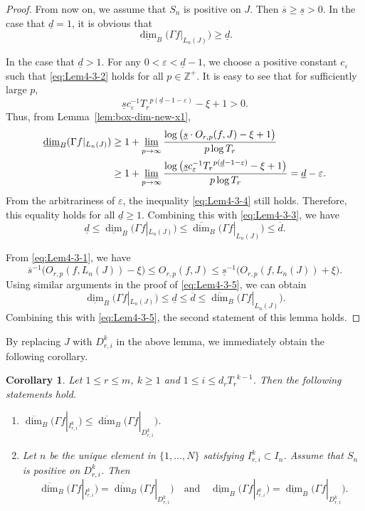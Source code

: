 \documentclass[11pt]{amsart}
\newtheorem{cor}[thm]{Corollary}
\theoremstyle{definition}
\theoremstyle{remark}
\numberwithin{equation}{section}
\newcommand{\bZp}{{{\mathbb Z}^+}}
\newcommand{\upd}{{\overline{d}}}
\newcommand{\lowd}{{\underline{d}}}
\newcommand{\ups}{{\overline{s} }}
\newcommand{\lows}{{\underline{s}}}
\def\vep{\varepsilon}
\def\updimB{\overline{\dim}_B}
\def\lowdimB{\underline{\dim}_B}
\begin{document}
\begin{proof}
	From now on, we assume that $S_n$ is positive on $J$. Then $\ups \geq \lows >0$. In the case that $\lowd=1$, it is obvious that    \begin{equation}\label{eq:Lem4-3-4}
		\lowdimB \big(\Gamma f|_{L_n(J)}\big)\geq \lowd. 
	\end{equation}
	
	In the case that $\lowd>1$. For any $0<\vep < \lowd-1$, we choose a positive constant $c_\vep$ such that \eqref{eq:Lem4-3-2} holds for all $p\in \bZp$. It is easy to see that for sufficiently large $p$,
	\[
	\lows c_\vep^{-1}  {T_r}^{p ( \lowd -1-\vep)}-\xi+1>0.
	\]
	Thus, from Lemma~\ref{lem:box-dim-new-x1},
	\begin{align*}
		\lowdimB (\Gamma f|_{L_n(J)}) 
		&\geq 1+\varliminf_{p \to \infty} \frac{\log \big(\lows \cdot O_{r,p}(f,J)-\xi+1\big)}{p \log T_r} \\
		&\geq 1+\varliminf_{p \to \infty} \frac{\log \big(\lows c_\vep^{-1}  {T_r}^{p ( \lowd -1-\vep)}-\xi+1\big)}{p \log T_r} 
		= \lowd-\vep .
	\end{align*}
	From the arbitrariness of $\vep$, the inequality \eqref{eq:Lem4-3-4} still holds. Therefore, this equality holds for all $\lowd\geq 1$. Combining this with \eqref{eq:Lem4-3-3}, we have
	\begin{equation}\label{eq:Lem4-3-5}
		\lowd \leq \lowdimB \big(\Gamma f|_{L_n(J)}\big)\leq  \updimB \big(\Gamma f|_{L_n(J)}\big) \leq  \upd .
	\end{equation}
	
	
	
	From \eqref{eq:Lem4-3-1}, we have
	\[
	\ups^{-1} \big(  O_{r,p}(f, L_n(J)) - \xi \big) \leq
	O_{r,p}(f,J) \leq \lows^{-1}  \big(  O_{r,p}(f,L_n(J)) +\xi \big).
	\]
	Using similar arguments in the proof of \eqref{eq:Lem4-3-5}, we can obtain
	\[
	\lowdimB \big(\Gamma f|_{L_n(J)}\big)\leq\lowd\leq  \upd \leq   \updimB \big(\Gamma f|_{L_n(J)}\big)  .
	\]
	Combining this with \eqref{eq:Lem4-3-5}, the second statement of this lemma holds.
\end{proof}


By replacing $J$ with $D_{r,i}^k$ in the above lemma, we immediately obtain the following corollary.
\begin{cor}\label{cor:box-pass}
	Let $1 \leq r \leq m$, $k \geq 1$ and $1 \leq i \leq d_r {T_r}^{k-1}$. Then the following statements hold.
	\begin{enumerate}
		\item 	$ \updimB \big(\Gamma f|_{I_{r,i}^k} \big) \leq  \updimB \big(\Gamma f|_{D_{r,i}^k} \big)$.
		\item  Let $n$ be the unique element in $\{1,\ldots,N\}$ satisfying $I_{r,i}^k\subset I_n$. 
		Assume that $S_n$ is positive on $D_{r,i}^k$. Then 
		\[
		 \updimB \big(\Gamma f|_{I_{r,i}^k} \big)= \updimB \big(\Gamma f|_{D_{r,i}^k} \big)\quad \mbox{and}\quad
		\lowdimB \big(\Gamma f|_{I_{r,i}^k} \big)=\lowdimB \big(\Gamma f|_{D_{r,i}^k} \big).
		\]			
	\end{enumerate}
\end{cor}
\end{document}
